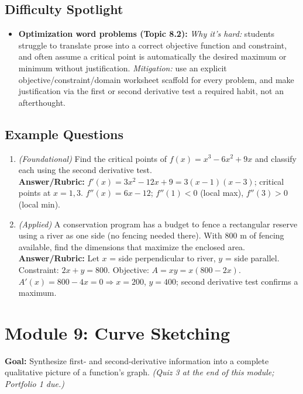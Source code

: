 \documentclass{article}
\begin{document}
\subsection*{Difficulty Spotlight}
\begin{itemize}[leftmargin=*]
  \item \textbf{Optimization word problems (Topic 8.2):} \textit{Why it's hard:} students struggle to translate prose into a correct objective function and constraint, and often assume a critical point is automatically the desired maximum or minimum without justification. \textit{Mitigation:} use an explicit objective/constraint/domain worksheet scaffold for every problem, and make justification via the first or second derivative test a required habit, not an afterthought.
\end{itemize}

\subsection*{Example Questions}
\begin{enumerate}[leftmargin=*]
  \item \textit{(Foundational)} Find the critical points of $f(x) = x^3 - 6x^2 + 9x$ and classify each using the second derivative test. \\
  \textbf{Answer/Rubric:} $f'(x)=3x^2-12x+9=3(x-1)(x-3)$; critical points at $x=1,3$. $f''(x)=6x-12$; $f''(1)<0$ (local max), $f''(3)>0$ (local min).
  \item \textit{(Applied)} A conservation program has a budget to fence a rectangular reserve using a river as one side (no fencing needed there). With 800 m of fencing available, find the dimensions that maximize the enclosed area. \\
  \textbf{Answer/Rubric:} Let $x$ = side perpendicular to river, $y$ = side parallel. Constraint: $2x+y=800$. Objective: $A=xy=x(800-2x)$. $A'(x)=800-4x=0 \Rightarrow x=200$, $y=400$; second derivative test confirms a maximum.
\end{enumerate}


\section{Module 9: Curve Sketching}
\textbf{Goal:} Synthesize first- and second-derivative information into a complete qualitative picture of a function's graph. \textit{(Quiz 3 at the end of this module; Portfolio 1 due.)}
\end{document}
